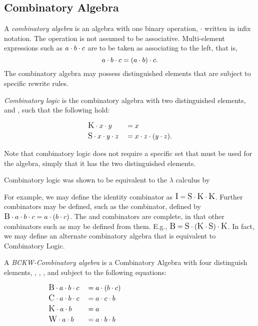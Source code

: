 \subsection{Combinatory Algebra} %
\label{sub:combinatory_algebra}

\begin{definition}\label{def:combinatory_algebra}
  A \emph{combinatory algebra} is an algebra with one binary operation, $\cdot$ written in infix
  notation. The operation is not assumed to be associative. Multi-element expressions such as $a \.
  b \. c$ are to be taken as associating to the left, that is,
  \[
    a \. b \. c = (a \.b)\.c.
  \]
  The combinatory algebra may possess distinguished elements that are subject to specific rewrite
  rules.
\end{definition}

\begin{definition}\label{def:combinatory_logic}
  \emph{Combinatory logic} is the combinatory algebra with two distinguished elements, \Kc and \Sc,
  such that the following hold:
  \begin{singlespace}
    \begin{align*}
      &\Kc \cdot x \cdot y &&= x\\
      &\Sc \cdot x \cdot y \cdot z &&= x \cdot z \cdot (y \cdot z).
    \end{align*}
  \end{singlespace}
\end{definition}

Note that combinatory logic does not require a specific set that must be used for the algebra,
simply that it has the two distinguished elements. 

Combinatory logic was shown to be equivalent to the $\lambda$ calculus by 

For example, we may define the identity combinator \Ic as $\Ic = \Sc \. \Kc \. \Kc$. Further
combinators may be defined, such as the \Bc combinator, defined by $\Bc \. a \. b \. c = a \. (b\.
c)$. The \Sc and \Kc combinators are complete, in that other combinators such as \Bc may be defined
from them. E.g., $\Bc = \Sc\.(\Kc\.\Sc)\.\Kc$. In fact, we may define an alternate combinatory
algebra that is equivalent to Combinatory Logic.

\begin{definition}\label{def:bckw_algebra}
  A \emph{BCKW-Combinatory algebra} is a Combinatory Algebra with four distinguish elements, \Bc,
  \Cc, \Kc, and \Wc subject to the following equations:
  \begin{singlespace}
    \begin{align*}
      &\Bc \. a\.b\.c   &&=a\.(b\.c)&\qquad\qquad\qquad\qquad\qquad\qquad\\
      &\Cc \. a\.b\.c   &&=a\.c\.b\\
      &\Kc \. a\.b      &&=a\\
      &\Wc\. a\.b       && = a\.b\.b
    \end{align*}
  \end{singlespace}
\end{definition}

